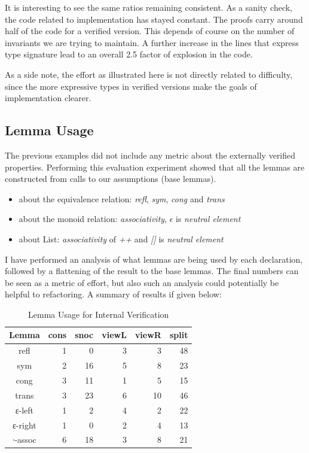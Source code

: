 \documentclass[12pt,twoside,notitlepage]{report}
\begin{document}
It is interesting to see the same ratios remaining consistent. As a sanity check, the code related to implementation has stayed constant. The proofs carry around half of the code for a verified version. This depends of course on the number of invariants we are trying to maintain. A further increase in the lines that express type signature lead to an overall 2.5 factor of explosion in the code.

As a side note, the effort as illustrated here is not directly related to difficulty, since the more expressive types in verified versions make the goals of implementation clearer.

\subsection{Lemma Usage}

The previous examples did not include any metric about the externally verified properties. 
Performing this evaluation experiment showed that all the lemmas are constructed from calls to our assumptions (base lemmas).

\begin{itemize}
\item about the equivalence relation: \textit{refl}, \textit{sym}, \textit{cong} and \textit{trans}
\item about the monoid relation: \textit{associativity}, $\epsilon$ is \textit{neutral element}
\item about List: \textit{associativity} of \textit{++} and \textit{[]} is \textit{neutral element}
\end{itemize} 

I have performed an analysis of what lemmas are being used by each declaration, followed by a flattening of the result to the base lemmas. The final numbers can be seen as a metric of effort, but also such an analysis could potentially be helpful to refactoring. A summary of results if given below:

\begin{table}[H]
\caption{Lemma Usage for Internal Verification}
\center
\begin{tabular}{c r r r r r}
\hline 
Lemma & cons & snoc & viewL & viewR & split \\
\hline
refl  	&	1	&	0	&	3&	3&  48\\
sym     &	2	&	16	&	5&	8&	23\\
cong   	&	3	&	11	&	1&	5&	15\\
trans  	&	3	&	23	&	6&	10& 46\\
ε-left  &	1	&	2	&	4&	2& 22\\  
ε-right &	1	&	0	&	2&	4& 13\\
∙-assoc &	6	&	18	&	3&	8& 21\\
\hline
\end{tabular}
\end{table} 
\end{document}
